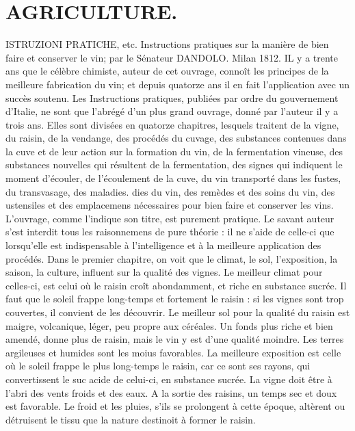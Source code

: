 \setcounter{page}{77} \section{AGRICULTURE.}
ISTRUZIONI PRATICHE, etc. Instructions pratiques sur la manière de bien faire et conserver le vin; par le Sénateur DANDOLO. Milan 1812.
IL y a trente ans que le célèbre chimiste, auteur de cet ouvrage, connoît les principes de la meilleure fabrication du vin; et depuis quatorze ans il en fait l'application avec un succès soutenu. Les Instructions pratiques, publiées par ordre du gouvernement d'Italie, ne sont que l'abrégé d'un plus grand ouvrage, donné par l'auteur il y a trois ans. Elles sont divisées en quatorze chapitres, lesquels traitent de la vigne, du raisin, de la vendange, des procédés du cuvage, des substances contenues dans la cuve et de leur action sur la formation du vin, de la fermentation vineuse, des substances nouvelles qui résultent de la fermentation, des signes qui indiquent le moment d'écouler, de l'écoulement de la cuve, du vin transporté dans les fustes, du transvasage, des maladies.\setcounter{page}{78} dies du vin, des remèdes et des soins du vin, des ustensiles et des emplacemens nécessaires pour bien faire et conserver les vins.
L’ouvrage, comme l’indique son titre, est purement pratique. Le savant auteur s’est interdit tous les raisonnemens de pure théorie : il ne s’aide de celle-ci que lorsqu’elle est indispensable à l’intelligence et à la meilleure application des procédés.
Dans le premier chapitre, on voit que le climat, le sol, l’exposition, la saison, la culture, influent sur la qualité des vignes. Le meilleur climat pour celles-ci, est celui où le raisin croît abondamment, et riche en substance sucrée. Il faut que le soleil frappe long-temps et fortement le raisin : si les vignes sont trop couvertes, il convient de les découvrir.
Le meilleur sol pour la qualité du raisin est maigre, volcanique, léger, peu propre aux céréales. Un fonds plus riche et bien amendé, donne plus de raisin, mais le vin y est d’une qualité moindre. Les terres argileuses et humides sont les moius favorables.
La meilleure exposition est celle où le soleil frappe le plus long-temps le raisin, car ce sont ses rayons, qui convertissent le suc\setcounter{page}{79} acide de celui-ci, en substance sucrée. La vigne doit être à l'abri des vents froids et des eaux.
A la sortie des raisins, un temps sec et doux est favorable. Le froid et les pluies, s'ils se prolongent à cette époque, altèrent ou détruisent le tissu que la nature destinoit à former le raisin.
